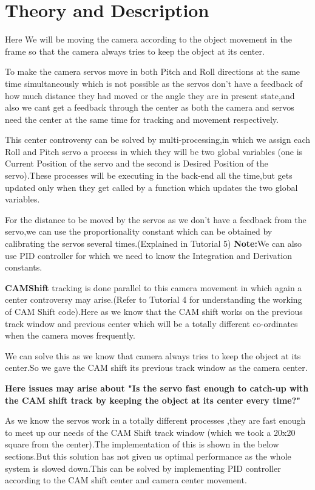 \documentclass[11pt,a4paper]{article}
\begin{document}
	\section{Theory and Description}
	Here We will be moving the camera according to the object movement in the frame so that the camera always tries to keep the object at its center.
	\par To make the camera servos move in both Pitch and Roll directions at the same time simultaneously which is not possible as the servos don't have a feedback of how much distance they had moved or the angle they are in present state,and also we cant get a feedback through the center as both the camera and servos need the center at the same time for tracking and movement respectively.
	\par This center controversy can be solved by multi-processing,in which we assign each Roll and Pitch servo a process in which they will be two global variables (one is Current Position of the servo and the second is Desired Position of the servo).These processes will be executing in the back-end all the time,but gets updated only when they get called by a function which updates the two global variables.   
	\par For the distance to be moved by the servos as we don't have a feedback from the servo,we can use the proportionality constant which can be obtained by calibrating the servos several times.(Explained in Tutorial 5)
	\newline
	\textbf{Note:}We can also use PID controller for which we need to know the Integration and Derivation constants. 
	 \vspace{1cm}
	 \par\textbf{CAMShift} tracking is done parallel to this camera movement in which again a center controversy may arise.(Refer to Tutorial 4 for understanding the working   of CAM Shift code).Here as we know that the CAM shift works on the previous track window and previous center which will be a totally different co-ordinates when the camera moves frequently.
	 \par We can solve this as we know that camera always tries to keep the object at its center.So we gave the CAM shift its previous track window as the camera center.
	 \par \textbf{Here issues may arise about "Is the servo fast enough to catch-up with the CAM shift track by keeping the object at its center every time?"}
	 \par  As we know the servos work in a totally different processes ,they are fast enough to meet up our needs of the CAM Shift track window (which we took a 20x20 square from the center).The implementation of this is shown in the below sections.But this solution has not given us optimal performance as the whole system is slowed down.This can be solved by implementing PID controller according to the CAM shift center and camera center movement.
	
\end{document}
